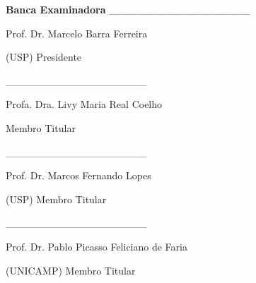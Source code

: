 \begin{folhadeaprovacao}
  \textbf{\Large{Banca Examinadora}}
  \vskip 2cm
    \_\_\_\_\_\_\_\_\_\_\_\_\_\_\_\_\_\_\_
  
    Prof. Dr. Marcelo Barra Ferreira
    
    (USP) Presidente
    \vskip 2cm
    
    \_\_\_\_\_\_\_\_\_\_\_\_\_\_\_\_\_\_\_
    
    Profa. Dra. Livy Maria Real Coelho
    
    Membro Titular
    \vskip 2cm
    
    \_\_\_\_\_\_\_\_\_\_\_\_\_\_\_\_\_\_\_
      
    Prof. Dr. Marcos Fernando Lopes

    (USP) Membro Titular

    \vskip 2cm
    \_\_\_\_\_\_\_\_\_\_\_\_\_\_\_\_\_\_\_
    

    Prof. Dr. Pablo Picasso Feliciano de Faria
    
    (UNICAMP) Membro Titular
 
  
    

\end{folhadeaprovacao}